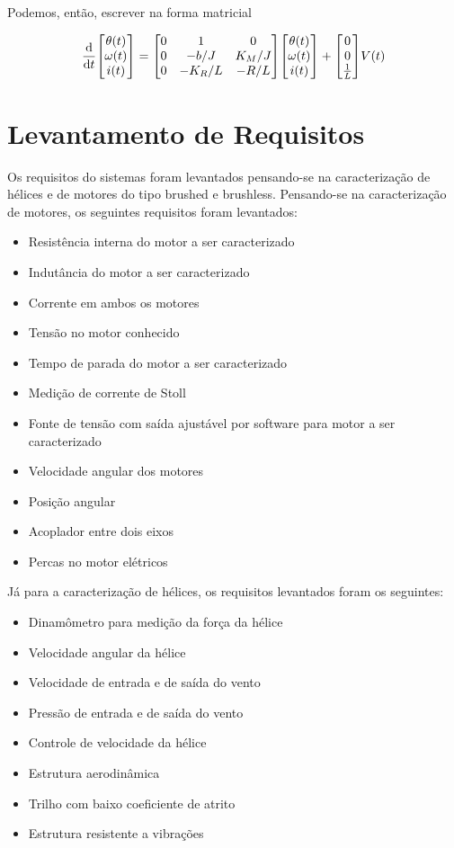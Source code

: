 \documentclass[12pt,brazilian]{article}
\begin{document}
Podemos, então, escrever na forma matricial

\begin{equation}
    \dv{t} \mqty[\theta(t) \\ \omega(t) \\ i(t)]=
    \mqty[ 0 & 1 & 0 \\ 0 & -b/J & K_M/J \\ 0 & -K_R/L & -R/L] 
    \mqty[\theta(t) \\ \omega(t) \\ i(t)]
    + \mqty[0\\0\\\frac{1}{L}]
    V(t)
\end{equation}




\section{Levantamento de Requisitos}
 Os requisitos do sistemas foram levantados pensando-se na caracterização de hélices e de motores do tipo brushed e brushless.
 Pensando-se na caracterização de motores, os seguintes requisitos foram levantados:
 \begin{itemize}
    \item Resistência interna do motor a ser caracterizado
    \item Indutância do motor a ser caracterizado
    \item Corrente em ambos os motores
    \item Tensão no motor conhecido
    \item Tempo de parada do motor a ser caracterizado
    \item Medição de corrente de Stoll
    \item Fonte de tensão com saída ajustável por software para motor a ser caracterizado
    \item Velocidade angular dos motores
    \item Posição angular
    \item Acoplador entre dois eixos
    \item Percas no motor elétricos
 \end{itemize}
 
 Já para a caracterização de hélices, os requisitos levantados foram os seguintes:
 \begin{itemize}
     \item Dinamômetro para medição da força da hélice
     \item Velocidade angular da hélice
     \item Velocidade de entrada e de saída do vento
     \item Pressão de entrada e de saída do vento
     \item Controle de velocidade da hélice
     \item Estrutura aerodinâmica 
     \item Trilho com baixo coeficiente de atrito 
     \item Estrutura resistente a vibrações
 \end{itemize}
\end{document}
